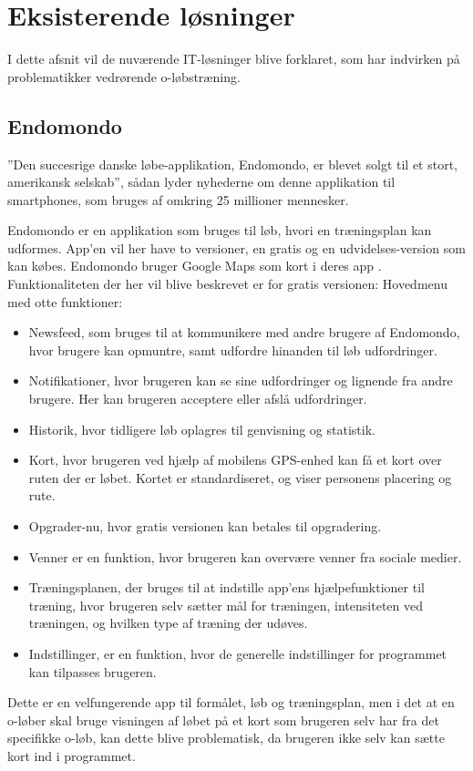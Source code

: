 \newpage
\section{Eksisterende løsninger}
I dette afsnit vil de nuværende IT-løsninger blive forklaret, som har indvirken på problematikker vedrørende o-løbstræning. 

\subsection{Endomondo}
”Den succesrige danske løbe-applikation, Endomondo, er blevet solgt til et stort, amerikansk selskab”, sådan lyder nyhederne om denne applikation til smartphones, som bruges af omkring 25 millioner mennesker. \citep{ENDO}

Endomondo er en applikation som bruges til løb, hvori en træningsplan kan udformes. App’en vil her have to versioner, en gratis og en udvidelses-version som kan købes. Endomondo bruger Google Maps som kort i deres app \citep{ENDOMAPS}. Funktionaliteten der her vil blive beskrevet er for gratis versionen: Hovedmenu med otte funktioner:
\begin{itemize}
	\item Newsfeed, som bruges til at kommunikere med andre brugere af Endomondo, hvor brugere kan opmuntre, samt udfordre hinanden til løb udfordringer.
	\item Notifikationer, hvor brugeren kan se sine udfordringer og lignende fra andre brugere. Her kan brugeren acceptere eller afslå udfordringer.
	\item Historik, hvor tidligere løb oplagres til genvisning og statistik.
	\item Kort, hvor brugeren ved hjælp af mobilens GPS-enhed kan få et kort over ruten der er løbet. Kortet er standardiseret, og viser personens placering og rute.
	\item Opgrader-nu, hvor gratis versionen kan betales til opgradering.
	\item Venner er en funktion, hvor brugeren kan overvære venner fra sociale medier.
	\item Træningsplanen, der bruges til at indstille app’ens hjælpefunktioner til træning, hvor brugeren selv sætter mål for træningen, intensiteten ved træningen, og hvilken type af træning der udøves.
	\item Indstillinger, er en funktion, hvor de generelle indstillinger for programmet kan tilpasses brugeren.
\end{itemize}
Dette er en velfungerende app til formålet, løb og træningsplan, men i det at en o-løber skal bruge visningen af løbet på et kort som brugeren selv har fra det specifikke o-løb, kan dette blive problematisk, da brugeren ikke selv kan sætte kort ind i programmet. 



